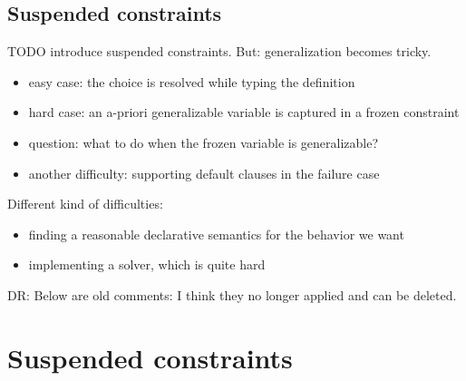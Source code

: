 \documentclass[acmsmall,screen,nonacm]{acmart}
\begin{document}
\begin{version}{}

\subsection {Suspended constraints}


TODO introduce suspended
constraints. But: generalization becomes tricky.
\begin{itemize}
\item easy case: the choice is resolved while typing the definition
\item hard case: an a-priori generalizable variable is captured in a frozen
   constraint 
\item question: what to do when the frozen variable is generalizable?
\item another difficulty: supporting default clauses in the failure case
\end{itemize}

Different kind of difficulties:
\begin{itemize}
\item finding a reasonable declarative semantics for the behavior we want
\item implementing a solver, which is quite hard
\end{itemize}

DR: Below are old comments: I think they no longer applied and can be
deleted.


\end{version}


\section{Suspended constraints}
\label{sec:constraints}
\end{document}
